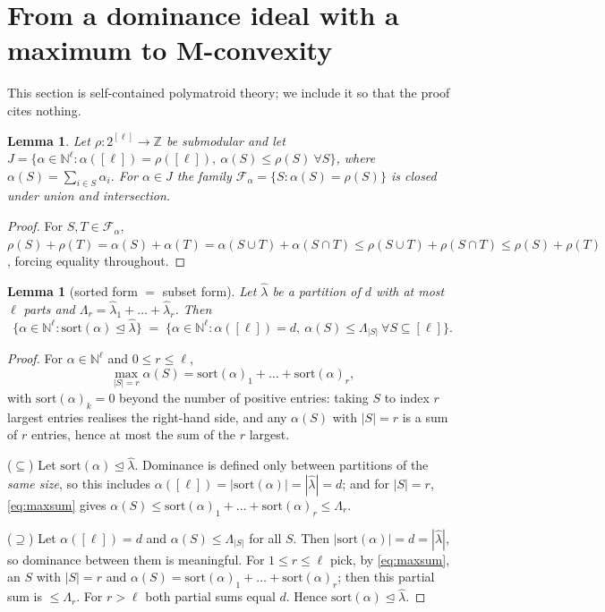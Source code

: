 \documentclass[11pt]{article}
\theoremstyle{plain}
\newtheorem{lem}[thm]{Lemma}
\theoremstyle{definition}
\newcommand{\Z}{\mathbb{Z}}
\newcommand{\N}{\mathbb{N}}
\begin{document}
\section{From a dominance ideal with a maximum to M-convexity}\label{sec:mconvex}

This section is self-contained polymatroid theory; we include it so that the proof cites
nothing.

\begin{lem}\label{lem:tight}
Let $\rho:2^{[\ell]}\to\Z$ be submodular and let
$J=\{\alpha\in\N^{\ell}:\alpha([\ell])=\rho([\ell]),\ \alpha(S)\le\rho(S)\ \forall S\}$, where
$\alpha(S)=\sum_{i\in S}\alpha_i$. For $\alpha\in J$ the family
$\mathcal{F}_\alpha=\{S:\alpha(S)=\rho(S)\}$ is closed under union and intersection.
\end{lem}
\begin{proof}
For $S,T\in\mathcal{F}_\alpha$,
$\rho(S)+\rho(T)=\alpha(S)+\alpha(T)=\alpha(S\cup T)+\alpha(S\cap T)\le\rho(S\cup T)+\rho(S\cap
T)\le\rho(S)+\rho(T)$, forcing equality throughout.
\end{proof}

\begin{lem}[sorted form $=$ subset form]\label{lem:JJ}
Let $\hat\lambda$ be a partition of $d$ with at most $\ell$ parts and
$\Lambda_r=\hat\lambda_1+\dots+\hat\lambda_r$. Then
\[
  \{\alpha\in\N^{\ell}:\mathrm{sort}(\alpha)\trianglelefteq\hat\lambda\}
  \;=\;\{\alpha\in\N^{\ell}:\alpha([\ell])=d,\ \alpha(S)\le\Lambda_{|S|}\ \forall S\subseteq[\ell]\}.
\]
\end{lem}

\begin{proof}
For $\alpha\in\N^{\ell}$ and $0\le r\le\ell$,
\begin{equation}\label{eq:maxsum}
  \max_{|S|=r}\alpha(S)=\mathrm{sort}(\alpha)_1+\dots+\mathrm{sort}(\alpha)_r,
\end{equation}
with $\mathrm{sort}(\alpha)_k=0$ beyond the number of positive entries: taking $S$ to index $r$
largest entries realises the right-hand side, and any $\alpha(S)$ with $|S|=r$ is a sum of $r$
entries, hence at most the sum of the $r$ largest.

($\subseteq$) Let $\mathrm{sort}(\alpha)\trianglelefteq\hat\lambda$. Dominance is defined only
between partitions of the \emph{same size}, so this includes
$\alpha([\ell])=|\mathrm{sort}(\alpha)|=|\hat\lambda|=d$; and for $|S|=r$, \eqref{eq:maxsum}
gives $\alpha(S)\le\mathrm{sort}(\alpha)_1+\dots+\mathrm{sort}(\alpha)_r\le\Lambda_r$.

($\supseteq$) Let $\alpha([\ell])=d$ and $\alpha(S)\le\Lambda_{|S|}$ for all $S$. Then
$|\mathrm{sort}(\alpha)|=d=|\hat\lambda|$, so dominance between them is meaningful. For
$1\le r\le\ell$ pick, by \eqref{eq:maxsum}, an $S$ with $|S|=r$ and
$\alpha(S)=\mathrm{sort}(\alpha)_1+\dots+\mathrm{sort}(\alpha)_r$; then this partial sum is
$\le\Lambda_r$. For $r>\ell$ both partial sums equal $d$. Hence
$\mathrm{sort}(\alpha)\trianglelefteq\hat\lambda$.
\end{proof}
\end{document}
